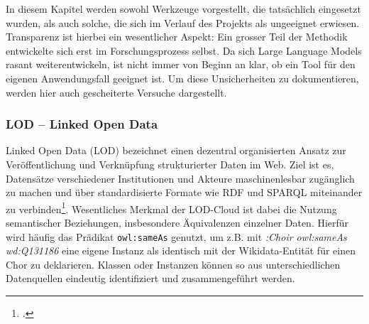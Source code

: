 \documentclass[12pt, a4paper, ngerman, bidi=default]{article}
\let\cite\footcite
\begin{document}
In diesem Kapitel werden sowohl Werkzeuge vorgestellt, die tatsächlich eingesetzt wurden, als auch solche, die sich 
im Verlauf des Projekts als ungeeignet erwiesen. Transparenz ist hierbei ein wesentlicher Aspekt: Ein grosser Teil der 
Methodik entwickelte sich erst im Forschungsprozess selbst. Da sich Large Language Models rasant weiterentwickeln, 
ist nicht immer von Beginn an klar, ob ein Tool für den eigenen Anwendungsfall geeignet ist.
Um diese Unsicherheiten zu dokumentieren, werden hier auch gescheiterte Versuche dargestellt.

\subsubsection{LOD – Linked Open Data}

Linked Open Data (LOD) bezeichnet einen dezentral organisierten Ansatz zur Veröffentlichung und 
Verknüpfung strukturierter Daten im Web. Ziel ist es, Datensätze verschiedener Institutionen und Akteure 
maschinenlesbar zugänglich zu machen und über standardisierte Formate wie RDF und SPARQL miteinander zu 
verbinden\cite[ vgl.][Preface S. VI \& S. 13f]{garoufallou_metadata_2020}. 
Wesentliches Merkmal der LOD-Cloud ist dabei die Nutzung semantischer Beziehungen, insbesondere Äquivalenzen einzelner Daten. 
Hierfür wird häufig das Prädikat \texttt{owl:sameAs} genutzt, um z.B. mit \colorbox{VeryLightGray}{\textit{:Choir owl:sameAs wd:Q131186}} eine eigene 
Instanz als identisch mit der Wikidata-Entität für einen Chor zu deklarieren.
Klassen oder Instanzen können so aus unterschiedlichen Datenquellen eindeutig identifiziert und zusammengeführt werden.
\end{document}
